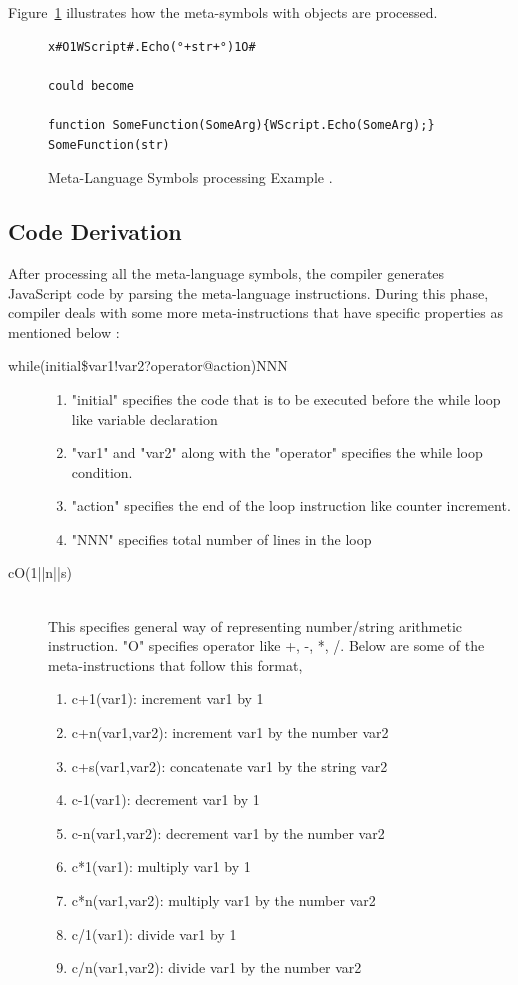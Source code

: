 Figure~\ref{fig:metalanguageprocessing} illustrates how the meta-symbols with objects are processed.

\begin{figure}
  \centering
  \begin{lstlisting}[language=myasm,numbers=none]
x#O1WScript#.Echo(°+str+°)1O# 

could become

function SomeFunction(SomeArg){WScript.Echo(SomeArg);}
SomeFunction(str)
\end{lstlisting}
    \caption[Meta-Language Symbols processing Example]{Meta-Language Symbols processing Example \cite{bib26}.}
    \label{fig:metalanguageprocessing}
\end{figure}

\subsection{Code Derivation}
After processing all the meta-language symbols, the compiler generates JavaScript code by parsing the meta-language instructions. During this phase, compiler deals with some more meta-instructions that have specific properties as mentioned below \cite{bib26}:
\begin{description}
\item[while(initial\$var1!var2?operator@action)NNN]\hfill 
\begin{enumerate}
\item "initial" specifies the code that is to be executed before the while loop like variable declaration
\item "var1" and "var2" along with the "operator" specifies the while loop condition.
\item "action" specifies the end of the loop instruction like counter increment.
\item "NNN" specifies total number of lines in the loop
\end{enumerate}

\item[cO(1||n||s)] \hfill \\
This specifies general way of representing number/string arithmetic instruction. "O" specifies operator like +, -, *, /. Below are some of the meta-instructions that follow this format,
\begin{enumerate}
\item c+1(var1): increment var1 by 1
\item c+n(var1,var2): increment var1 by the number var2
\item c+s(var1,var2): concatenate var1 by the string var2
\item c-1(var1): decrement var1 by 1
\item c-n(var1,var2): decrement var1 by the number var2
\item c*1(var1): multiply var1 by 1
\item c*n(var1,var2): multiply var1 by the number var2
\item c/1(var1): divide var1 by 1
\item c/n(var1,var2): divide var1 by the number var2 
  \end{enumerate}
\end{description}

